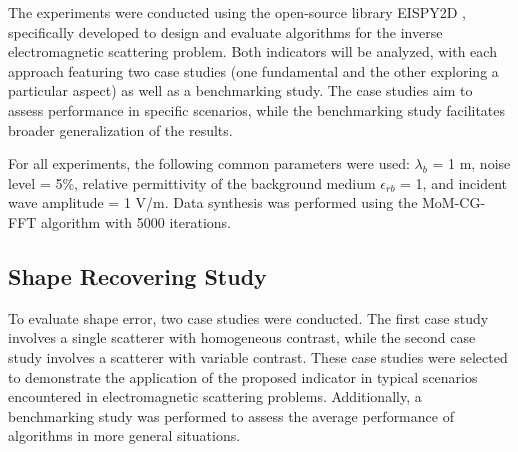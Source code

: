 \documentclass{IEEEtran}
\begin{document}

        The experiments were conducted using the open-source library EISPY2D \cite{batista2025eispy2d}, specifically developed to design and evaluate algorithms for the inverse electromagnetic scattering problem. Both indicators will be analyzed, with each approach featuring two case studies (one fundamental and the other exploring a particular aspect) as well as a benchmarking study. The case studies aim to assess performance in specific scenarios, while the benchmarking study facilitates broader generalization of the results.

        For all experiments, the following common parameters were used: $\lambda_b$ = 1 m, noise level = 5\%, relative permittivity of the background medium $\epsilon_{rb}$ = 1, and incident wave amplitude = 1 V/m. Data synthesis was performed using the MoM-CG-FFT algorithm \cite{su1987calculation} with 5000 iterations.
	
		\subsection{Shape Recovering Study}\label{sec:results:shape}
		

            To evaluate shape error, two case studies were conducted. The first case study involves a single scatterer with homogeneous contrast, while the second case study involves a scatterer with variable contrast. These case studies were selected to demonstrate the application of the proposed indicator in typical scenarios encountered in electromagnetic scattering problems. Additionally, a benchmarking study was performed to assess the average performance of algorithms in more general situations.
			
\end{document}
